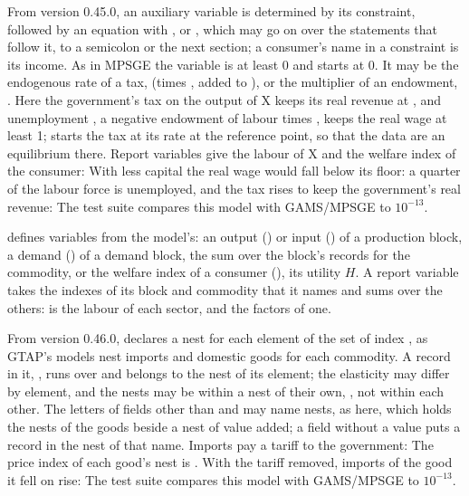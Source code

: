 From version 0.45.0, an auxiliary variable is determined by its constraint,
 followed by an equation with ,
 or , which may go on over the statements that follow
it, to a semicolon or the next section; a consumer's name in a constraint
is its income. As in MPSGE the variable is at least 0 and starts at 0. It
may be the endogenous rate of a tax,  (times , added to
), or the multiplier of an endowment, . Here the
government's tax on the output of X keeps its real revenue at
, and unemployment , a negative endowment of labour
times , keeps the real wage at least 1;  starts the
tax at its rate at the reference point, so that the data are an
equilibrium there. Report variables give the labour of X and the welfare
index of the consumer:
With less capital the real wage would fall below its floor: a quarter of
the labour force is unemployed, and the tax rises to keep the
government's real revenue:
The test suite compares this model with GAMS/MPSGE to $10^{-13}$.


 defines variables from the model's: an output () or
input () of a production block, a demand () of a demand
block, the sum over the block's records for the commodity, or the welfare
index of a consumer (), its utility $H$. A report variable
takes the indexes of its block and commodity that it names and sums over
the others:  is the labour of each
sector, and  the factors of one.


From version 0.46.0,  declares a nest for each
element of the set of index , as GTAP's models nest imports and
domestic goods for each commodity. A record in it, ,
runs over  and belongs to the nest of its element; the elasticity
may differ by element, and the nests may be within a nest of their own,
\cmd{):}, not within each other. The
letters of fields other than  and  may name nests, as
 here, which holds the nests of the goods beside a nest of value
added; a field without a value puts a record in the nest of that name.
Imports pay a tariff to the government:
The price index of each good's nest is \cmd{)}. With
the tariff removed, imports of the good it fell on rise:
The test suite compares this model with GAMS/MPSGE to $10^{-13}$.

